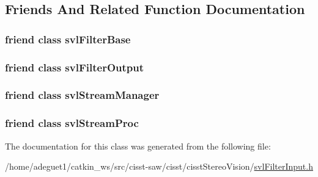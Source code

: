 \subsection{Friends And Related Function Documentation}
\hypertarget{classsvl_filter_input_aadcba5e897486de2d761520b866f4ac0}{
\subsubsection[{svl\-Filter\-Base}]{\setlength{\rightskip}{0pt plus 5cm}friend class {\bf svl\-Filter\-Base}\hspace{0.3cm}{\ttfamily [friend]}}}\label{classsvl_filter_input_aadcba5e897486de2d761520b866f4ac0}
\hypertarget{classsvl_filter_input_a3f45c3511fc124d190c8ffb5953025f6}{
\subsubsection[{svl\-Filter\-Output}]{\setlength{\rightskip}{0pt plus 5cm}friend class {\bf svl\-Filter\-Output}\hspace{0.3cm}{\ttfamily [friend]}}}\label{classsvl_filter_input_a3f45c3511fc124d190c8ffb5953025f6}
\hypertarget{classsvl_filter_input_ab5eee58544f2ce644140e932afbe32db}{
\subsubsection[{svl\-Stream\-Manager}]{\setlength{\rightskip}{0pt plus 5cm}friend class {\bf svl\-Stream\-Manager}\hspace{0.3cm}{\ttfamily [friend]}}}\label{classsvl_filter_input_ab5eee58544f2ce644140e932afbe32db}
\hypertarget{classsvl_filter_input_a6a9ee1dec5ca263793dca09411295245}{
\subsubsection[{svl\-Stream\-Proc}]{\setlength{\rightskip}{0pt plus 5cm}friend class {\bf svl\-Stream\-Proc}\hspace{0.3cm}{\ttfamily [friend]}}}\label{classsvl_filter_input_a6a9ee1dec5ca263793dca09411295245}


The documentation for this class was generated from the following file\-:\begin{DoxyCompactItemize}
\item 
/home/adeguet1/catkin\-\_\-ws/src/cisst-\/saw/cisst/cisst\-Stereo\-Vision/\hyperlink{svl_filter_input_8h}{svl\-Filter\-Input.\-h}\end{DoxyCompactItemize}

